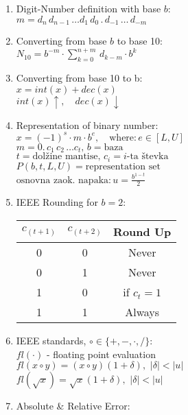 \documentclass[12pt]{amsart}
\theoremstyle{plain}
\begin{document}
\begin{enumerate}
  \item Digit-Number definition with base $b$: \\
  $ m= d_n\, d_{n-1} \, \ldots d_1 \, d_0 \, . \, d_{-1} \, \ldots \,d_{-m} $
  \item Converting from base $b$ to base 10: \\
  $ N_{10} = b^{-m} \cdot \sum_{k=0}^{n + m} \, d_{k - m} \cdot b^k$
  \item Converting from base 10 to b: \\
  $x = int(x) + dec(x)$ \\
  $int(x) \uparrow, \quad dec(x) \downarrow $
  \item Representation of binary number: \\
  $ x = (-1)^s \cdot m \cdot b^{e}, \quad \text{where:} \, e \in [L, U]$ \\
  $ m = 0.\, c_1 \, c_2 \, \ldots c_t, \, b = \text{baza}$\\
  $ t = \text{dolžine mantise}, \, c_i = \text{$i$-ta števka}$ \\
  $ P(b, t, L, U) = \text{representation set}$  \\
  $ \text{osnovna zaok. napaka:} \, u = \frac{b^{1-t}}{2} $
  \item IEEE Rounding for $b=2$:
  \vspace{-0.3cm}
  \begin{table}[h!]
    \quad \quad \quad \raggedright
    \begin{tabular}{||c c c||} 
    \hline
    $c_{ (t+1) }$ & $c_{ (t+2) }$ & Round Up \\ [0.5ex] 
    \hline\hline
    0 & 0 & Never \\
    0 & 1 & Never \\
    1 & 0 & if $c_t=1$ \\
    1 & 1 & Always \\
    \hline
    \end{tabular}
  \end{table}
  \vspace{-0.3cm}
  \item IEEE standards, $\circ \in \{ +, -, \cdot, / \}$: \\
  $fl(\cdot)$ - floating point evaluation \\
  $fl(x \circ y) = (x \circ y)(1 + \delta), \,\, |\delta| < |u|$ \\
  $fl(\sqrt{x}) = \sqrt{x} (1 + \delta), \,\, |\delta| < |u|$
  \item Absolute \& Relative Error: \\

\end{enumerate}
\end{document}
